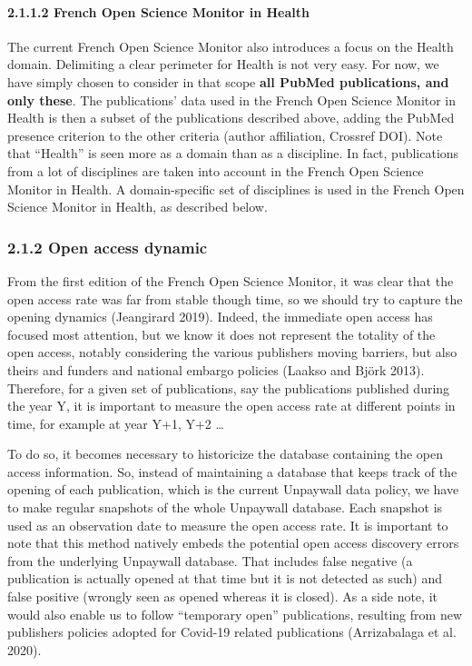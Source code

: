 \documentclass[
]{article}
\begin{document}
\hypertarget{french-open-science-monitor-in-health}{%
\paragraph{2.1.1.2 French Open Science Monitor in
Health}\label{french-open-science-monitor-in-health}}

The current French Open Science Monitor also introduces a focus on the
Health domain. Delimiting a clear perimeter for Health is not very easy.
For now, we have simply chosen to consider in that scope \textbf{all
PubMed publications, and only these}. The publications' data used in the
French Open Science Monitor in Health is then a subset of the
publications described above, adding the PubMed presence criterion to
the other criteria (author affiliation, Crossref DOI). Note that
``Health'' is seen more as a domain than as a discipline. In fact,
publications from a lot of disciplines are taken into account in the
French Open Science Monitor in Health. A domain-specific set of
disciplines is used in the French Open Science Monitor in Health, as
described below.

\hypertarget{open-access-dynamic}{%
\subsubsection{2.1.2 Open access dynamic}\label{open-access-dynamic}}

From the first edition of the French Open Science Monitor, it was clear
that the open access rate was far from stable though time, so we should
try to capture the opening dynamics (Jeangirard 2019). Indeed, the
immediate open access has focused most attention, but we know it does
not represent the totality of the open access, notably considering the
various publishers moving barriers, but also theirs and funders and
national embargo policies (Laakso and Björk 2013). Therefore, for a
given set of publications, say the publications published during the
year Y, it is important to measure the open access rate at different
points in time, for example at year Y+1, Y+2 \ldots{}

To do so, it becomes necessary to historicize the database containing
the open access information. So, instead of maintaining a database that
keeps track of the opening of each publication, which is the current
Unpaywall data policy, we have to make regular snapshots of the whole
Unpaywall database. Each snapshot is used as an observation date to
measure the open access rate. It is important to note that this method
natively embeds the potential open access discovery errors from the
underlying Unpaywall database. That includes false negative (a
publication is actually opened at that time but it is not detected as
such) and false positive (wrongly seen as opened whereas it is closed).
As a side note, it would also enable us to follow ``temporary open''
publications, resulting from new publishers policies adopted for
Covid-19 related publications (Arrizabalaga et al. 2020).
\end{document}
